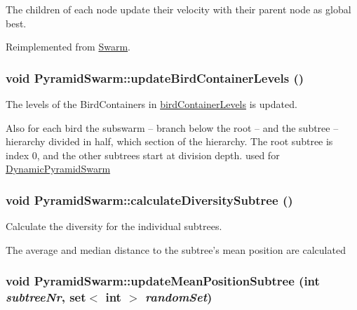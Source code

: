 The children of each node update their velocity with their parent node as global best. 

Reimplemented from \hyperlink{classSwarm_be668c680f5bdd27bd2c4244a8a431bf}{Swarm}.\hypertarget{classPyramidSwarm_08b947b4263eb221c30271fe54f6ae33}{
\subsubsection{\setlength{\rightskip}{0pt plus 5cm}void PyramidSwarm::updateBirdContainerLevels ()}}
\label{classPyramidSwarm_08b947b4263eb221c30271fe54f6ae33}


The levels of the BirdContainers in \hyperlink{classPyramidSwarm_d61fc84d8f5bdb25d1e008e181f695bb}{birdContainerLevels} is updated. 

Also for each bird the subswarm -- branch below the root -- and the subtree -- hierarchy divided in half, which section of the hierarchy. The root subtree is index 0, and the other subtrees start at division depth. used for \hyperlink{classDynamicPyramidSwarm}{DynamicPyramidSwarm} \hypertarget{classPyramidSwarm_41331a3f455fcbd596989f79715b1b8b}{
\subsubsection{\setlength{\rightskip}{0pt plus 5cm}void PyramidSwarm::calculateDiversitySubtree ()}}
\label{classPyramidSwarm_41331a3f455fcbd596989f79715b1b8b}


Calculate the diversity for the individual subtrees. 

The average and median distance to the subtree's mean position are calculated \hypertarget{classPyramidSwarm_113cc1a3ee99a45c346fd3018a20ea7b}{
\subsubsection{\setlength{\rightskip}{0pt plus 5cm}void PyramidSwarm::updateMeanPositionSubtree (int {\em subtreeNr}, \/  set$<$ int $>$ {\em randomSet})}}
\label{classPyramidSwarm_113cc1a3ee99a45c346fd3018a20ea7b}


